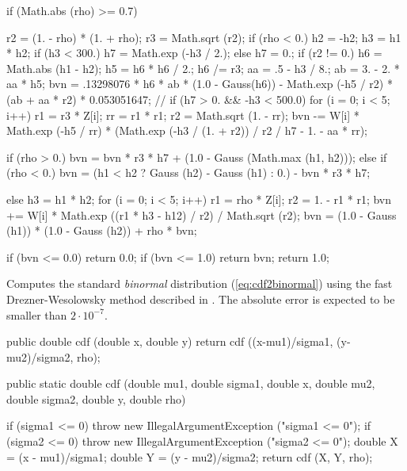 \begin{code}
\begin{hide}
{      if (Math.abs (rho) >= 0.7) {
         r2 = (1. - rho) * (1. + rho);
         r3 = Math.sqrt (r2);
         if (rho < 0.)
            h2 = -h2;
         h3 = h1 * h2;
         if (h3 < 300.)
            h7 = Math.exp (-h3 / 2.);
         else
            h7 = 0.;
         if (r2 != 0.) {
            h6 = Math.abs (h1 - h2);
            h5 = h6 * h6 / 2.;
            h6 /= r3;
            aa = .5 - h3 / 8.;
            ab = 3. - 2. * aa * h5;
            bvn = .13298076 * h6 * ab * (1.0 - Gauss(h6))
               - Math.exp (-h5 / r2) * (ab + aa * r2) * 0.053051647;
//          if (h7 > 0.  && -h3 < 500.0)
            for (i = 0; i < 5; i++) {
               r1 = r3 * Z[i];
               rr = r1 * r1;
               r2 = Math.sqrt (1. - rr);
               bvn -= W[i] * Math.exp (-h5 / rr) * 
                   (Math.exp (-h3 / (1. + r2)) / r2 / h7 - 1. - aa * rr);
            }
         }

         if (rho > 0.)
            bvn = bvn * r3 * h7 + (1.0 - Gauss (Math.max (h1, h2)));
         else if (rho < 0.)
            bvn = (h1 < h2 ? Gauss (h2) - Gauss (h1) : 0.) - bvn * r3 * h7;

      } else {
         h3 = h1 * h2;
         for (i = 0; i < 5; i++) {
            r1 = rho * Z[i];
            r2 = 1. - r1 * r1;
            bvn += W[i] * Math.exp ((r1 * h3 - h12) / r2) / Math.sqrt (r2);
         }
         bvn = (1.0 - Gauss (h1)) * (1.0 - Gauss (h2)) + rho * bvn;
      }

      if (bvn <= 0.0)
         return 0.0;
      if (bvn <= 1.0)
         return bvn;
      return 1.0;
   }\end{hide}
\end{code}
\begin{tabb}
   Computes the standard {\em binormal\/} distribution (\ref{eq:cdf2binormal})
   using the fast Drezner-Wesolowsky method described in \cite{tDRE90a}. 
   The absolute error is expected to be smaller  than $2 \cdot 10^{-7}$.  
\end{tabb}
\begin{code}\begin{hide}

   public double cdf (double x, double y) {
      return cdf ((x-mu1)/sigma1, (y-mu2)/sigma2, rho);
   }\end{hide}
    
   public static double cdf (double mu1, double sigma1, double x, 
                             double mu2, double sigma2, double y,
                             double rho) \begin{hide} {
      if (sigma1 <= 0)
         throw new IllegalArgumentException ("sigma1 <= 0");
      if (sigma2 <= 0)
         throw new IllegalArgumentException ("sigma2 <= 0");
      double X = (x - mu1)/sigma1;
      double Y = (y - mu2)/sigma2;
      return cdf (X, Y, rho);
   }\end{hide}
\end{code}

